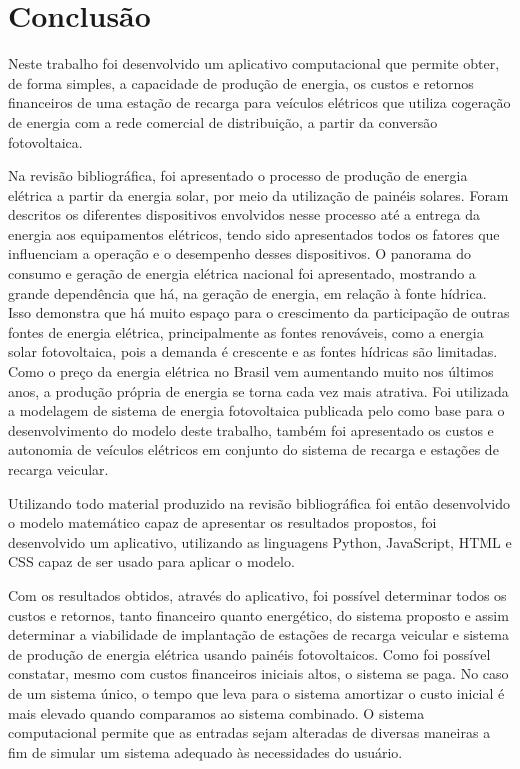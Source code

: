 \chapter{Conclusão}\label{conclusoes}

Neste trabalho foi desenvolvido um aplicativo computacional que permite obter, de forma simples, a capacidade de produção de energia, os custos e retornos financeiros de uma estação de recarga para veículos elétricos que utiliza cogeração de energia com a rede comercial de distribuição, a partir da conversão fotovoltaica.

Na revisão bibliográfica, foi apresentado o processo de produção de energia elétrica a partir da energia solar, por meio da utilização de painéis solares. Foram descritos os diferentes dispositivos envolvidos nesse processo até a entrega da energia aos equipamentos elétricos, tendo sido apresentados todos os fatores que influenciam a operação e o desempenho desses dispositivos.
O panorama do consumo e geração de energia elétrica nacional foi apresentado, mostrando a grande dependência que há, na geração de energia, em relação à fonte hídrica. Isso demonstra que há muito espaço para o crescimento da participação de outras fontes de energia elétrica, principalmente as fontes renováveis, como a energia solar fotovoltaica, pois a demanda é crescente e as fontes hídricas são limitadas.
Como o preço da energia elétrica no Brasil vem aumentando muito nos últimos anos, a produção própria de energia se torna cada vez mais atrativa. Foi utilizada a modelagem de sistema de energia fotovoltaica publicada pelo \cite{sandia} como base para o desenvolvimento do modelo deste trabalho, também foi apresentado os custos e autonomia de veículos elétricos em conjunto do sistema de recarga e estações de recarga veicular.

Utilizando todo material produzido na revisão bibliográfica foi então desenvolvido o modelo matemático capaz de apresentar os resultados propostos, foi desenvolvido um aplicativo, utilizando as linguagens Python, JavaScript, HTML e CSS capaz de ser usado para aplicar o modelo.

Com os resultados obtidos, através do aplicativo, foi possível determinar todos os custos e retornos, tanto financeiro quanto energético, do sistema proposto e assim determinar a viabilidade de implantação de estações de recarga veicular e sistema de produção de energia elétrica usando painéis fotovoltaicos. Como foi possível constatar, mesmo
com custos financeiros iniciais altos, o sistema se paga. No caso de um sistema único, o tempo que leva para o sistema amortizar o custo inicial é mais elevado quando comparamos ao sistema combinado. O sistema computacional permite que as entradas sejam alteradas de diversas maneiras a fim de simular um sistema adequado às necessidades do usuário.

